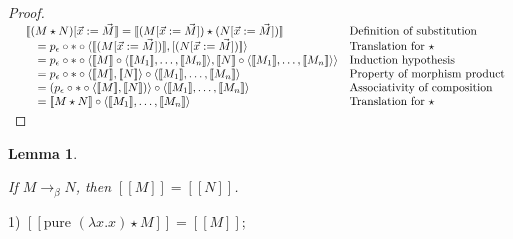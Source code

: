 \documentclass[a4paper]{article}
\newtheorem{lemma}{Lemma}
\begin{document}
\begin{proof}
$\begin{array}{lll}
& [\![(M \star N) [ \vec{x} := \vec{M}] \!] = [\![(M [\vec{x} := \vec{M}]) \star (N [ \vec{x} := \vec{M}])]\!]& \text{Definition of substitution} \\
&\quad = p_{\epsilon} \circ \ast \circ \langle [\![(M [\vec{x} := \vec{M}])]\!], [(N [\vec{x} := \vec{M}])]\!] \rangle & \text{Translation for $\star$} \\
&\quad = p_{\epsilon} \circ \ast \circ \langle [\![M]\!] \circ \langle [\![M_1]\!], \dots,
[\![M_n]\!] \rangle, [\![N]\!] \circ \langle [\![M_1]\!], \dots,
[\![M_n]\!] \rangle\rangle & \text{Induction hypothesis} \\
&\quad = p_{\epsilon} \circ \ast \circ \langle  [\![M]\!], [\![N]\!] \rangle \circ \langle [\![M_1]\!], \dots,
[\![M_n]\!] \rangle& \text{Property of morphism product} \\
&\quad = (p_{\epsilon} \circ \ast \circ \langle  [\![M]\!], [\![N]\!]) \rangle \circ \langle [\![M_1]\!],
\dots, [\![M_n]\!] \rangle& \text{Associativity of composition} \\
&\quad = [\![M \star N]\!] \circ \langle [\![M_1]\!], \dots, [\![M_n]\!] \rangle& \text{Translation for $
\star$}
\end{array}$

\end{proof}

\begin{lemma}

$ $

If $M \rightarrow_{\beta} N$, then $[\![M]\!] = [\![N]\!]$.

\end{lemma}

1) $[\![\text{pure } (\lambda x. x) \star M]\!] = [\![M]\!]$;

\vspace{\baselineskip}

\begin{prooftree}
\end{prooftree}
\end{document}
